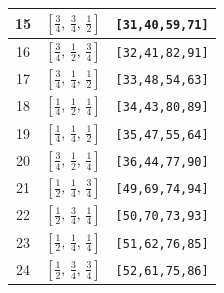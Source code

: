 \documentclass[fleqn,8pt]{jsarticle}
\begin{document}
\begin{longtable}{ccc}
15 & $\left[ \frac{3}{4},\, \frac{3}{4},\, \frac{1}{2} \right]$ & {\tt [31,40,59,71]} \\ \hline
16 & $\left[ \frac{3}{4},\, \frac{1}{2},\, \frac{3}{4} \right]$ & {\tt [32,41,82,91]} \\ \hline
17 & $\left[ \frac{3}{4},\, \frac{1}{4},\, \frac{1}{2} \right]$ & {\tt [33,48,54,63]} \\ \hline
18 & $\left[ \frac{1}{4},\, \frac{1}{2},\, \frac{1}{4} \right]$ & {\tt [34,43,80,89]} \\ \hline
19 & $\left[ \frac{1}{4},\, \frac{1}{4},\, \frac{1}{2} \right]$ & {\tt [35,47,55,64]} \\ \hline
20 & $\left[ \frac{3}{4},\, \frac{1}{2},\, \frac{1}{4} \right]$ & {\tt [36,44,77,90]} \\ \hline
21 & $\left[ \frac{1}{2},\, \frac{1}{4},\, \frac{3}{4} \right]$ & {\tt [49,69,74,94]} \\ \hline
22 & $\left[ \frac{1}{2},\, \frac{3}{4},\, \frac{1}{4} \right]$ & {\tt [50,70,73,93]} \\ \hline
23 & $\left[ \frac{1}{2},\, \frac{1}{4},\, \frac{1}{4} \right]$ & {\tt [51,62,76,85]} \\ \hline
24 & $\left[ \frac{1}{2},\, \frac{3}{4},\, \frac{3}{4} \right]$ & {\tt [52,61,75,86]} \\
\end{longtable}
\renewcommand{\arraystretch}{1.2}
\end{document}
